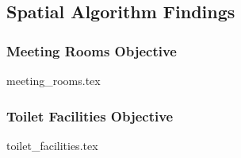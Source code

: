 \subsection{Spatial Algorithm Findings}

\subsubsection{Meeting Rooms Objective}

{meeting_rooms.tex}

\subsubsection{Toilet Facilities Objective}
{toilet_facilities.tex}